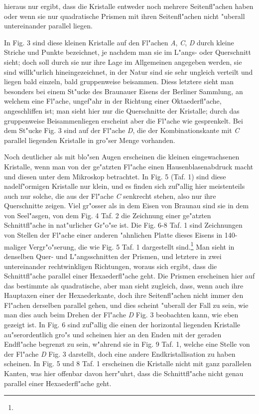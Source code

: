 \documentclass[a4paper, 11pt, oneside]{article}
\begin{document}
hieraus nur ergibt, dass die Kristalle entweder noch mehrere Seitenfl"achen haben oder wenn sie nur quadratische Prismen mit ihren Seitenfl"achen nicht "uberall untereinander parallel liegen.

In Fig. 3 sind diese kleinen Kristalle auf den Fl"achen \emph{A}, \emph{C}, \emph{D} durch kleine Striche und Punkte bezeichnet, je nachdem man sie im L"angs- oder Querschnitt sieht; doch soll durch sie nur ihre Lage im Allgemeinen angegeben werden, sie sind willk"urlich hineingezeichnet, in der Natur sind sie sehr ungleich verteilt und liegen bald einzeln, bald gruppenweise beisammen. Diess letztere sieht man besonders bei einem St"ucke des Braunauer Eisens der Berliner Sammlung, an welchem eine Fl"ache, ungef"ahr in der Richtung einer Oktaederfl"ache, angeschliffen ist; man sieht hier nur die Querschnitte der Kristalle; durch das gruppenweise Beisammenliegen erscheint aber die Fl"ache wie gesprenkelt. Bei dem St"ucke Fig. 3 sind auf der Fl"ache \emph{D}, die der Kombinationskante mit \emph{C} parallel liegenden Kristalle in gro"ser Menge vorhanden.

Noch deutlicher als mit blo"sen Augen erscheinen die kleinen eingewachsenen Kristalle, wenn man von der ge"atzten Fl"ache einen Hausenblasenabdruck macht und diesen unter dem Mikroskop betrachtet. In Fig. 5 (Taf. 1) sind diese nadelf"ormigen Kristalle nur klein, und es finden sich zuf"allig hier meistenteils auch nur solche, die aus der Fl"ache \emph{C} senkrecht stehen, also nur ihre Querschnitte zeigen. Viel gr"osser als in dem Eisen von Braunau sind sie in dem von Seel"asgen, von dem Fig. 4 Taf. 2 die Zeichnung einer ge"atzten Schnittfl"ache in nat"urlicher Gr"o"se ist. Die Fig. 6-8 Taf. 1 sind Zeichnungen von Stellen der Fl"ache einer anderen "ahnlichen Platte dieses Eisens in 140-maliger Vergr"o"serung, die wie Fig. 5 Taf. 1 dargestellt sind.\footnote{} Man sieht in denselben Quer- und L"angsschnitten der Prismen, und letztere in zwei untereinander rechtwinkligen Richtungen, woraus sich ergibt, dass die Schnittfl"ache parallel einer Hexaederfl"ache geht. Die Prismen erscheinen hier auf das bestimmte als quadratische, aber man sieht zugleich, dass, wenn auch ihre Hauptaxen einer der Hexaederkante, doch ihre Seitenfl"achen nicht immer den Fl"achen derselben parallel gehen, und dies scheint "uberall der Fall zu sein, wie man dies auch beim Drehen der Fl"ache \emph{D} Fig. 3 beobachten kann, wie eben gezeigt ist. In Fig. 6 sind zuf"allig die einen der horizontal liegenden Kristalle au"serordentlich gro"s und scheinen hier an den Enden mit der geraden Endfl"ache begrenzt zu sein, w"ahrend sie in Fig. 9 Taf. 1, welche eine Stelle von der Fl"ache \emph{D} Fig. 3 darstellt, doch eine andere Endkristallisation zu haben scheinen. In Fig. 5 und 8 Taf. 1 erscheinen die Kristalle nicht mit ganz parallelen Kanten, was hier offenbar davon herr"uhrt, dass die Schnittfl"ache nicht genau parallel einer Hexaederfl"ache geht.
\end{document}
